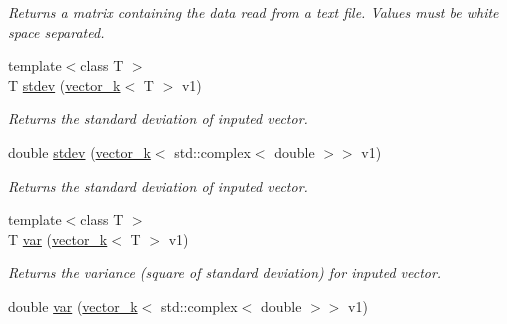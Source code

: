 \begin{DoxyCompactItemize}
\begin{DoxyCompactList}\small\item\em Returns a matrix containing the data read from a text file. Values must be white space separated. \end{DoxyCompactList}\item 
\hypertarget{namespacekeycpp_a61234b7bb0f3126b3db82634675c2951}{{\footnotesize template$<$class T $>$ }\\T \hyperlink{namespacekeycpp_a61234b7bb0f3126b3db82634675c2951}{stdev} (\hyperlink{classkeycpp_1_1vector__k}{vector\-\_\-k}$<$ T $>$ v1)}\label{namespacekeycpp_a61234b7bb0f3126b3db82634675c2951}

\begin{DoxyCompactList}\small\item\em Returns the standard deviation of inputed vector. \end{DoxyCompactList}\item 
\hypertarget{namespacekeycpp_abdec07a4c4dd0fc5de230a753bf59066}{double \hyperlink{namespacekeycpp_abdec07a4c4dd0fc5de230a753bf59066}{stdev} (\hyperlink{classkeycpp_1_1vector__k}{vector\-\_\-k}$<$ std\-::complex$<$ double $>$$>$ v1)}\label{namespacekeycpp_abdec07a4c4dd0fc5de230a753bf59066}

\begin{DoxyCompactList}\small\item\em Returns the standard deviation of inputed vector. \end{DoxyCompactList}\item 
\hypertarget{namespacekeycpp_a553528cf7a020895037ce3b1a828a04c}{{\footnotesize template$<$class T $>$ }\\T \hyperlink{namespacekeycpp_a553528cf7a020895037ce3b1a828a04c}{var} (\hyperlink{classkeycpp_1_1vector__k}{vector\-\_\-k}$<$ T $>$ v1)}\label{namespacekeycpp_a553528cf7a020895037ce3b1a828a04c}

\begin{DoxyCompactList}\small\item\em Returns the variance (square of standard deviation) for inputed vector. \end{DoxyCompactList}\item 
\hypertarget{namespacekeycpp_af3249effde70a573fbd8881dc4629e04}{double \hyperlink{namespacekeycpp_af3249effde70a573fbd8881dc4629e04}{var} (\hyperlink{classkeycpp_1_1vector__k}{vector\-\_\-k}$<$ std\-::complex$<$ double $>$$>$ v1)}\label{namespacekeycpp_af3249effde70a573fbd8881dc4629e04}


\end{DoxyCompactItemize}
